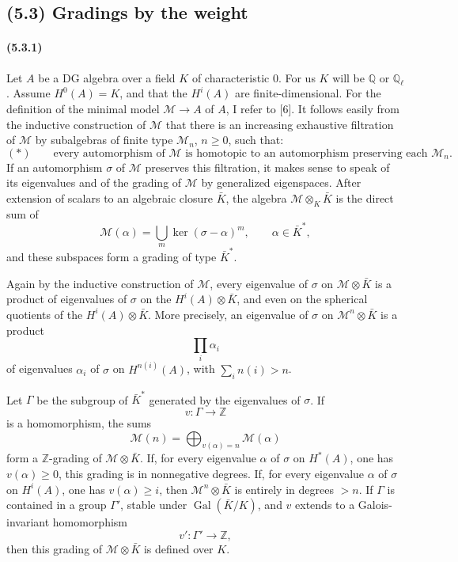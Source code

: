 \documentclass[11pt]{article}
\theoremstyle{remark}
\newcommand{\Ql}{\mathbb{Q}_\ell}
\newcommand{\ZZ}{\mathbb{Z}}
\newcommand{\QQ}{\mathbb{Q}}
\begin{document}
\subsection*{(5.3) Gradings by the weight}

\paragraph{(5.3.1)}
Let \(A\) be a DG algebra over a field \(K\) of characteristic \(0\).  For us \(K\) will be \(\QQ\) or \(\Ql\).  Assume \(H^0(A)=K\), and that the \(H^i(A)\) are finite-dimensional.  For the definition of the minimal model \(\mathcal M\to A\) of \(A\), I refer to [6].  It follows easily from the inductive construction of \(\mathcal M\) that there is an increasing exhaustive filtration of \(\mathcal M\) by subalgebras of finite type \(\mathcal M_n\), \(n\ge 0\), such that:
\[
(*)\qquad
\text{every automorphism of }\mathcal M\text{ is homotopic to an automorphism preserving each }\mathcal M_n.
\]
If an automorphism \(\sigma\) of \(\mathcal M\) preserves this filtration, it makes sense to speak of its eigenvalues and of the grading of \(\mathcal M\) by generalized eigenspaces.  After extension of scalars to an algebraic closure \(\bar K\), the algebra \(\mathcal M\otimes_K\bar K\) is the direct sum of
\[
\mathcal M(\alpha)=\bigcup_m\ker(\sigma-\alpha)^m,\qquad \alpha\in\bar K^*,
\]
and these subspaces form a grading of type \(\bar K^*\).

Again by the inductive construction of \(\mathcal M\), every eigenvalue of \(\sigma\) on \(\mathcal M\otimes\bar K\) is a product of eigenvalues of \(\sigma\) on the \(H^i(A)\otimes\bar K\), and even on the spherical quotients of the \(H^i(A)\otimes\bar K\).  More precisely, an eigenvalue of \(\sigma\) on \(\mathcal M^n\otimes\bar K\) is a product
\[
\prod_i \alpha_i
\]
of eigenvalues \(\alpha_i\) of \(\sigma\) on \(H^{n(i)}(A)\), with \(\sum_i n(i)>n\).

Let \(\Gamma\) be the subgroup of \(\bar K^*\) generated by the eigenvalues of \(\sigma\).  If
\[
v:\Gamma\longrightarrow\ZZ
\]
is a homomorphism, the sums
\[
\mathcal M(n)=\bigoplus_{v(\alpha)=n}\mathcal M(\alpha)
\]
form a \(\ZZ\)-grading of \(\mathcal M\otimes\bar K\).  If, for every eigenvalue \(\alpha\) of \(\sigma\) on \(H^*(A)\), one has \(v(\alpha)\ge 0\), this grading is in nonnegative degrees.  If, for every eigenvalue \(\alpha\) of \(\sigma\) on \(H^i(A)\), one has \(v(\alpha)\ge i\), then \(\mathcal M^n\otimes\bar K\) is entirely in degrees \(>n\).  If \(\Gamma\) is contained in a group \(\Gamma'\), stable under \(\operatorname{Gal}(\bar K/K)\), and \(v\) extends to a Galois-invariant homomorphism
\[
v':\Gamma'\longrightarrow\ZZ,
\]
then this grading of \(\mathcal M\otimes\bar K\) is defined over \(K\).
\end{document}
